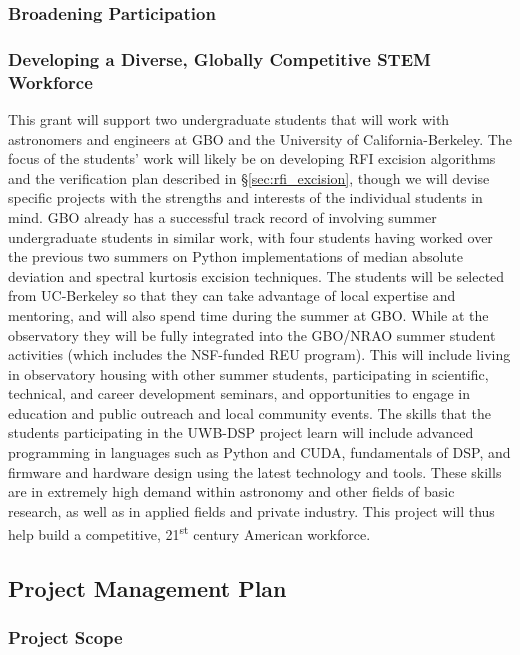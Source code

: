 \documentclass[10pt]{myNSF}
\begin{document}
\subsubsection{Broadening Participation}
\label{sec:participation}

\subsubsection{Developing a Diverse, Globally Competitive STEM
  Workforce}
\label{sec:workforce}

This grant will support two undergraduate students that will work with
astronomers and engineers at GBO and the University of
California-Berkeley.  The focus of the students' work will likely be
on developing RFI excision algorithms and the verification plan
described in \S\ref{sec:rfi_excision}, though we will devise specific
projects with the strengths and interests of the individual students
in mind.  GBO already has a successful track record of involving
summer undergraduate students in similar work, with four students
having worked over the previous two summers on Python implementations
of median absolute deviation and spectral kurtosis excision
techniques.  The students will be selected from UC-Berkeley so that
they can take advantage of local expertise and mentoring, and will
also spend time during the summer at GBO.  While at the observatory
they will be fully integrated into the GBO/NRAO summer student
activities (which includes the NSF-funded REU program).  This will
include living in observatory housing with other summer students,
participating in scientific, technical, and career development
seminars, and opportunities to engage in education and public outreach
and local community events.  The skills that the students
participating in the UWB-DSP project learn will include advanced
programming in languages such as Python and CUDA, fundamentals of DSP,
and firmware and hardware design using the latest technology and
tools.  These skills are in extremely high demand within astronomy and
other fields of basic research, as well as in applied fields and
private industry.  This project will thus help build a competitive,
21\textsuperscript{st} century American workforce.

\subsection{Project Management Plan}
\label{sec:plan}

\subsubsection{Project Scope}
\label{sec:scope}
\end{document}
